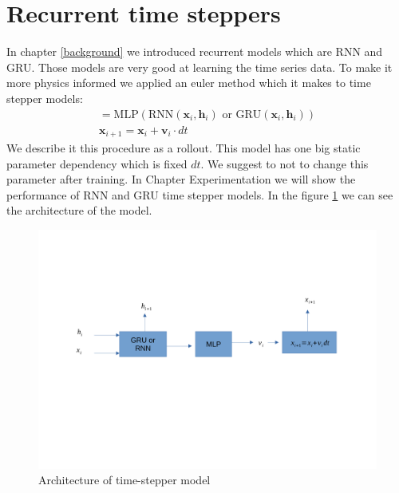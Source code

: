 \section{Recurrent time steppers}
In chapter \ref{background}  we introduced recurrent models which are RNN and GRU.
Those models are very good at learning the time series data. To make it more physics informed we applied an euler method which it makes to time stepper models:
\begin{eqnarray}
	[\mathbf{v}_i, \mathbf{h}_{i+1}] = \text{MLP}(\text{RNN}(\mathbf{x}_i,\mathbf{h}_i) \text{  or  }  \text{GRU}(\mathbf{x}_i,\mathbf{h}_i))\\
	\mathbf{x}_{i+1} = \mathbf{x}_i + \mathbf{v}_i \cdot dt
\end{eqnarray}
We describe it this procedure as a rollout. 
This model has one big static parameter dependency which is fixed $dt$. We suggest to not to change this parameter after training. In Chapter Experimentation we will show the performance of RNN and GRU time stepper models. In the figure \ref{fig:rnn} we can see the architecture of the model.
\begin{figure}[h!]
	\includegraphics[width=15cm]{chapters/chapter4/GRU_stepper}
	
	\caption{Architecture of time-stepper model}
	\label{fig:rnn}
\end{figure}



